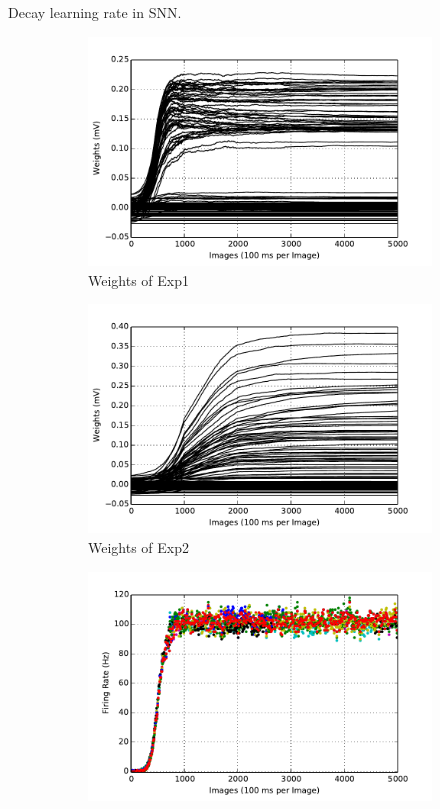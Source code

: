	Decay learning rate in SNN.
	\begin{figure}
		\centering
		\begin{subfigure}[t]{0.4\textwidth}
			\includegraphics[width=\textwidth]{pics_ae/exp1_weights_s_decay.pdf}
			\caption{Weights of Exp1}
		\end{subfigure}
		\begin{subfigure}[t]{0.4\textwidth}
			\includegraphics[width=\textwidth]{pics_ae/exp2_weights_s_decay.pdf}
			\caption{Weights of Exp2}
		\end{subfigure}
		\begin{subfigure}[t]{0.4\textwidth}
			\includegraphics[width=\textwidth]{pics_ae/exp1_recon_s_decay.pdf}

\end{subfigure}
\end{figure}
